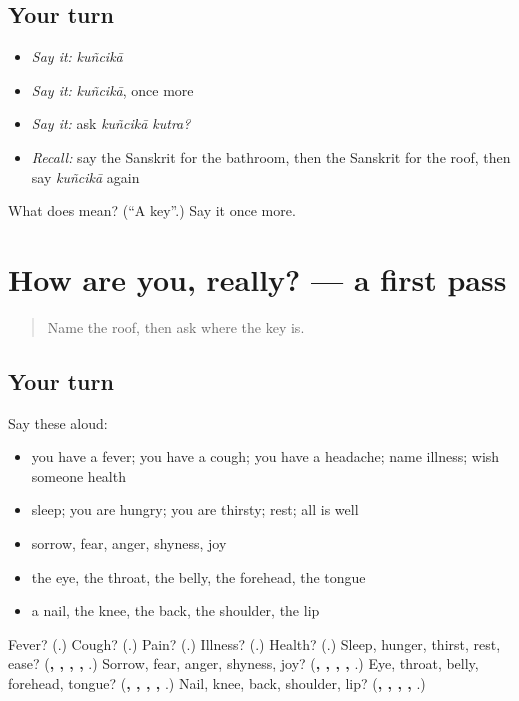 \subsection*{Your turn}
\begin{itemize}
\raggedright
  \item \emph{Say it:} \emph{kuñcikā}
  \item \emph{Say it:} \emph{kuñcikā}, once more
  \item \emph{Say it:} ask \emph{kuñcikā kutra?}
  \item \emph{Recall:} say the Sanskrit for the bathroom, then the Sanskrit for the roof, then say \emph{kuñcikā} again
\end{itemize}

\begin{tcolorbox}[breakable,colback=teal!4,colframe=teal!35!black,title={Before you move on}]
What does  mean? (\textquotedblleft{}A key\textquotedblright{}.) Say it once more.
\end{tcolorbox}
\section[(dialogue)]{How are you, really? — a first pass}

\label{lesson:SA-R77-first-pass-body-and-feelings}



\begin{quote}
Name the roof, then ask where the key is.
\end{quote}

\subsection*{Your turn}
Say these aloud:

\begin{itemize}
\raggedright
  \item you have a fever; you have a cough; you have a headache; name illness; wish someone health
  \item sleep; you are hungry; you are thirsty; rest; all is well
  \item sorrow, fear, anger, shyness, joy
  \item the eye, the throat, the belly, the forehead, the tongue
  \item a nail, the knee, the back, the shoulder, the lip
\end{itemize}

\begin{tcolorbox}[breakable,colback=teal!4,colframe=teal!35!black,title={Before you move on}]
Fever? (\textbf{}.) Cough? (\textbf{}.) Pain? (\textbf{}.) Illness? (\textbf{}.) Health? (\textbf{}.) Sleep, hunger, thirst, rest, ease? (\textbf{, , , , }.) Sorrow, fear, anger, shyness, joy? (\textbf{, , , , }.) Eye, throat, belly, forehead, tongue? (\textbf{, , , , }.) Nail, knee, back, shoulder, lip? (\textbf{, , , , }.)
\end{tcolorbox}
